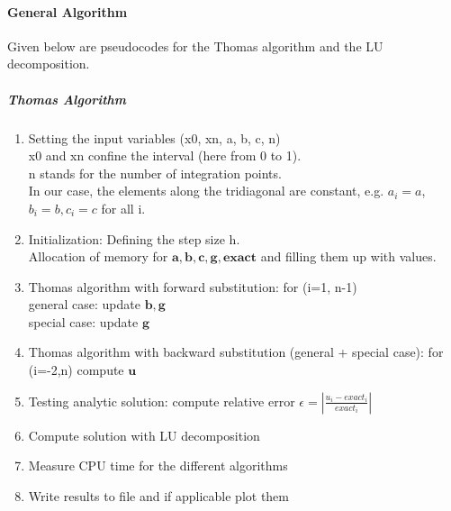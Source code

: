 \documentclass[%
oneside,                 %
final,                   %
10pt]{article}
\begin{document}
\paragraph{General Algorithm}
Given below are pseudocodes for the Thomas algorithm and the LU decomposition.
\subparagraph{Thomas Algorithm}
\begin{enumerate}
\item Setting the input variables (x0, xn, a, b, c, n) \\
	x0 and xn confine the interval (here from 0 to 1). \\
	n stands for the number of integration points. \\
	In our case, the elements along the tridiagonal are constant, e.g. $a_i=a$, $b_i=b, c_i=c$ for all i.

\item Initialization: Defining the step size h. \\
	Allocation of memory for $ \mathbf{a}, \mathbf{b}, \mathbf{c}, \mathbf{g}, \mathbf{exact}$  and filling them up with values.

\item Thomas algorithm with forward substitution: for (i=1, n-1)\\
	general case: update $\mathbf{b}, \mathbf{g}$ \\
	special case: update $\mathbf{g}$

\item Thomas algorithm with backward substitution (general + special case): for (i=-2,n) compute $\mathbf{u}$

\item Testing analytic solution: compute relative error $  \epsilon =  \left\lvert \frac{u_i-exact_i}{exact_i} \right\rvert$

\item Compute solution with LU decomposition

\item Measure CPU time for the different algorithms

\item Write results to file and if applicable plot them
\end{enumerate}
\end{document}
